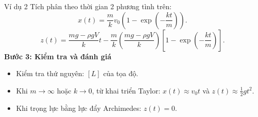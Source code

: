 \begin{frame}{Ví dụ 2}
Tích phân theo thời gian 2 phương tình trên:
\begin{equation*}
    x(t) = \dfrac{m}{k}v_0\left(1 - \exp\left(-\dfrac{kt}{m}\right)\right).
\end{equation*}
\begin{equation*}
    z(t) = \dfrac{mg - \rho g V}{k}t - \dfrac{m}{k}\left(\dfrac{mg - \rho g V}{k}\right)\left[1 - \exp\left(-\dfrac{kt}{m}\right)\right].
\end{equation*}
\textbf{Bước 3: Kiểm tra và đánh giá}
\begin{itemize}
    \item Kiểm tra thứ nguyên: \([L]\) của tọa độ.
    \item Khi \(m\to\infty\) hoặc \(k\to 0\), từ khai triển Taylor: \(x(t)\approx v_0 t\) và \(z(t)\approx \frac12 g t^2\).
    \item Khi trọng lực bằng lực đẩy Archimedes: \(z(t)=0\).
\end{itemize}
\end{frame}
